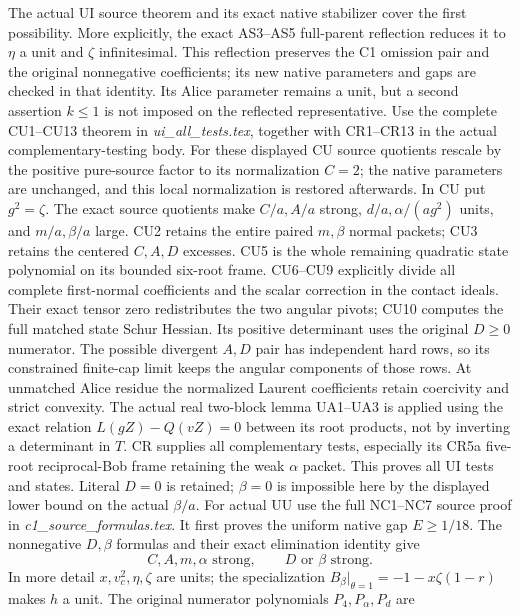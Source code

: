 The actual UI source theorem and its exact native stabilizer cover
the first possibility.  More explicitly, the exact AS3--AS5
full-parent reflection reduces it to \(\eta\) a unit and
\(\zeta\) infinitesimal.  This reflection preserves the C1 omission
pair and the original nonnegative coefficients; its new native
parameters and gaps are checked in that identity.  Its Alice
parameter remains a unit, but a second assertion \(k\leq1\) is
not imposed on the reflected representative.
Use the complete CU1--CU13 theorem in
\emph{ui\_all\_tests.tex}, together with CR1--CR13 in the actual
complementary-testing body.  For these displayed CU source
quotients rescale by the positive pure-source factor to its
normalization \(C=2\); the native parameters are unchanged,
and this local normalization is restored afterwards.
In CU put \(g^2=\zeta\).
The exact source quotients make \(C/a,A/a\) strong,
\(d/a,\alpha/(ag^2)\) units, and \(m/a,\beta/a\) large.
CU2 retains the entire paired \(m,\beta\) normal packets;
CU3 retains the centered \(C,A,D\) excesses.
CU5 is the whole remaining quadratic state polynomial on
its bounded six-root frame.  CU6--CU9 explicitly divide all
complete first-normal coefficients and the scalar correction in the
contact ideals.  Their exact tensor zero redistributes the
two angular pivots; CU10 computes the full matched state
Schur Hessian.  Its positive determinant uses the original
\(D\geq0\) numerator.  The possible divergent \(A,D\) pair has
independent hard rows, so its constrained finite-cap limit
keeps the angular components of those rows.
At unmatched Alice residue the normalized Laurent coefficients
retain coercivity and strict convexity.  The actual real
two-block lemma UA1--UA3 is applied using the exact relation
\(L(gZ)-Q(vZ)=0\) between its root products, not by inverting
a determinant in \(T\).  CR supplies all complementary tests,
especially its CR5a five-root reciprocal-Bob frame retaining
the weak \(\alpha\) packet.  This proves all UI tests and states.
Literal \(D=0\) is retained; \(\beta=0\) is impossible here by
the displayed lower bound on the actual \(\beta/a\).
For actual UU use the full NC1--NC7 source proof in
\emph{c1\_source\_formulas.tex}.
It first proves the uniform native gap \(E\geq1/18\).
The nonnegative \(D,\beta\) formulas and their exact elimination
identity give
\[
 C,A,m,\alpha\text{ strong},\qquad
                    D\text{ or }\beta\text{ strong}.
\tag{LC7}
\]
In more detail \(x,v_c^2,\eta,\zeta\) are units; the specialization
\(B_\beta|_{\theta=1}=-1-x\zeta(1-r)\) makes \(h\) a unit.
The original numerator polynomials \(P_4,P_\alpha,P_d\) are

